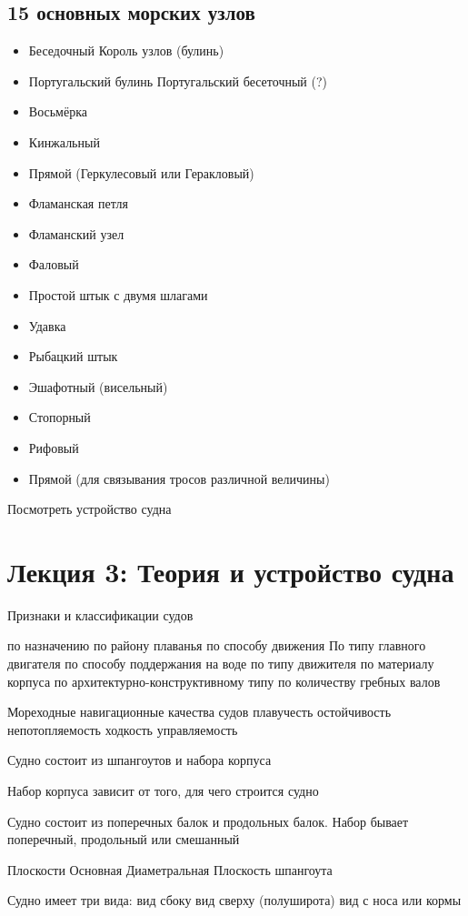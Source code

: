\documentclass{article}        %
\begin{document}
\begin{description}
\subsection{15 основных морских узлов}
\begin{itemize}
	\item Беседочный Король узлов (булинь)
	\item Португальский булинь  Португальский бесеточный (?) 
	\item Восьмёрка
	\item Кинжальный
	\item Прямой (Геркулесовый или Геракловый)
	\item Фламанская петля
	\item Фламанский узел
	\item Фаловый
	\item Простой штык с двумя шлагами
	\item Удавка
	\item Рыбацкий штык
	\item Эшафотный (висельный)
	\item Стопорный
	\item Рифовый
	\item Прямой (для связывания тросов различной величины)
\end{itemize}
Посмотреть устройство судна

\section{Лекция 3: Теория и устройство судна}
Признаки и классификации судов

по назначению
по району плаванья
по способу движения
По типу главного двигателя
по способу поддержания на воде
по типу движителя
по материалу корпуса
по архитектурно-конструктивному типу
по количеству гребных валов

Мореходные навигационные качества судов
плавучесть
остойчивость
непотопляемость
ходкость
управляемость


Судно состоит из шпангоутов и набора корпуса

Набор корпуса зависит от того, для чего строится судно

Судно состоит из поперечных балок и продольных балок. Набор бывает поперечный, продольный или смешанный

Плоскости
Основная
Диаметральная
Плоскость шпангоута

Судно имеет три вида:
вид сбоку
вид сверху (полуширота)
вид с носа или кормы


\end{description}
\end{document}
